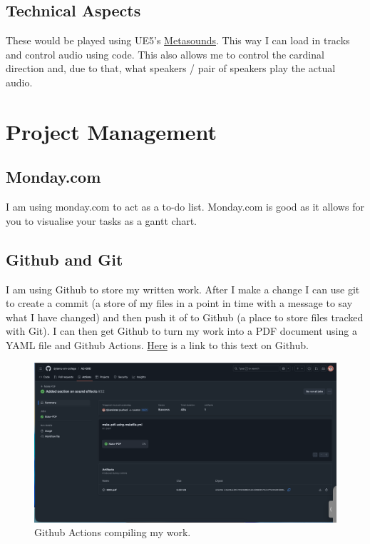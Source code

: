 \documentclass[12pt]{article}
\begin{document}
	\subsection{Technical Aspects}
	These would be played using UE5's \href{https://dev.epicgames.com/documentation/en-us/unreal-engine/metasounds-the-next-generation-sound-sources-in-unreal-engine}{Metasounds}. This way I can load in tracks and control audio using code. This also allows me to control the cardinal direction and, due to that, what speakers / pair of speakers play the actual audio.
	
	\section{Project Management}
	\subsection{Monday.com}
	I am using monday.com to act as a to-do list. Monday.com is good as it allows for you to visualise your tasks as a gantt chart.
	\subsection{Github and Git}
	I am using Github to store my written work. After I make a change I can use git to create a commit (a store of my files in a point in time with a message to say what I have changed) and then push it of to Github (a place to store files tracked with Git). I can then get Github to turn my work into a PDF document using a YAML file and Github Actions. \href{https://github.com/dylanru-sm-college/A2-GDD}{Here} is a link to this text on Github.
	\begin{figure}[h]
			\includegraphics[scale=0.29]{githubActionsUI.png}
			\centering
			\caption{Github Actions compiling my work.} 
	\end{figure}

	\newpage
	{\setlength{\parskip}{0pt}%
	
	}
	
\end{document}

